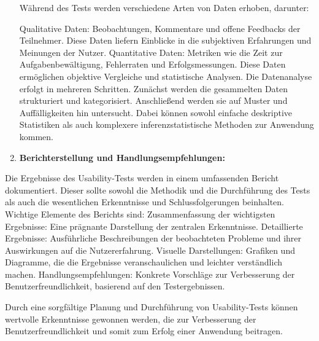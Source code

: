 \begin{enumerate}
Während des Tests werden verschiedene Arten von Daten erhoben, darunter:

Qualitative Daten: Beobachtungen, Kommentare und offene Feedbacks der Teilnehmer. Diese Daten liefern Einblicke in die subjektiven Erfahrungen und Meinungen der Nutzer.
Quantitative Daten: Metriken wie die Zeit zur Aufgabenbewältigung, Fehlerraten und Erfolgsmessungen. Diese Daten ermöglichen objektive Vergleiche und statistische Analysen.
Die Datenanalyse erfolgt in mehreren Schritten. Zunächst werden die gesammelten Daten strukturiert und kategorisiert. Anschließend werden sie auf Muster und Auffälligkeiten hin untersucht. Dabei können sowohl einfache deskriptive Statistiken als auch komplexere inferenzstatistische Methoden zur Anwendung kommen.


    \item \textbf{Berichterstellung und Handlungsempfehlungen:}
\end{enumerate}
Die Ergebnisse des Usability-Tests werden in einem umfassenden Bericht dokumentiert. Dieser sollte sowohl die Methodik und die Durchführung des Tests als auch die wesentlichen Erkenntnisse und Schlussfolgerungen beinhalten. Wichtige Elemente des Berichts sind:
Zusammenfassung der wichtigsten Ergebnisse: Eine prägnante Darstellung der zentralen Erkenntnisse.
Detaillierte Ergebnisse: Ausführliche Beschreibungen der beobachteten Probleme und ihrer Auswirkungen auf die Nutzererfahrung.
Visuelle Darstellungen: Grafiken und Diagramme, die die Ergebnisse veranschaulichen und leichter verständlich machen.
Handlungsempfehlungen: Konkrete Vorschläge zur Verbesserung der Benutzerfreundlichkeit, basierend auf den Testergebnissen.

Durch eine sorgfältige Planung und Durchführung von Usability-Tests können wertvolle Erkenntnisse gewonnen werden, die zur Verbesserung der Benutzerfreundlichkeit und somit zum Erfolg einer Anwendung beitragen.